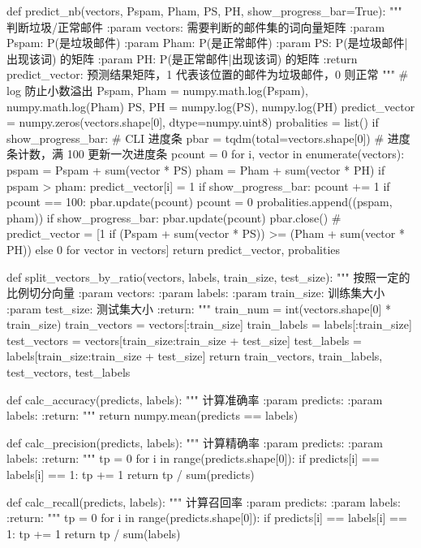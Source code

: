 \documentclass[UTF8,zihao=-4]{ctexart}
\begin{document}
\begin{python}
def predict_nb(vectors, Pspam, Pham, PS, PH, show_progress_bar=True):
    """
    判断垃圾/正常邮件
    :param vectors:         需要判断的邮件集的词向量矩阵
    :param Pspam:           P(是垃圾邮件)
    :param Pham:            P(是正常邮件)
    :param PS:              P(是垃圾邮件|出现该词) 的矩阵
    :param PH:              P(是正常邮件|出现该词) 的矩阵
    :return predict_vector: 预测结果矩阵，1 代表该位置的邮件为垃圾邮件，0 则正常
    """
    # log 防止小数溢出
    Pspam, Pham = numpy.math.log(Pspam), numpy.math.log(Pham)
    PS, PH = numpy.log(PS), numpy.log(PH)
    predict_vector = numpy.zeros(vectors.shape[0], dtype=numpy.uint8)
    probalities = list()
    if show_progress_bar:
        # CLI 进度条
        pbar = tqdm(total=vectors.shape[0])
        # 进度条计数，满 100 更新一次进度条
        pcount = 0
    for i, vector in enumerate(vectors):
        pspam = Pspam + sum(vector * PS)
        pham = Pham + sum(vector * PH)
        if pspam > pham:
            predict_vector[i] = 1
        if show_progress_bar:
            pcount += 1
            if pcount == 100:
                pbar.update(pcount)
                pcount = 0
        probalities.append((pspam, pham))
    if show_progress_bar:
        pbar.update(pcount)
        pbar.close()
    # predict_vector = [1 if (Pspam + sum(vector * PS)) >= (Pham + sum(vector * PH)) else 0 for vector in vectors]
    return predict_vector, probalities


def split_vectors_by_ratio(vectors, labels, train_size, test_size):
    """
    按照一定的比例切分向量
    :param vectors:
    :param labels:
    :param train_size:   训练集大小
    :param test_size:   测试集大小
    :return:
    """
    train_num = int(vectors.shape[0] * train_size)
    train_vectors = vectors[:train_size]
    train_labels = labels[:train_size]
    test_vectors = vectors[train_size:train_size + test_size]
    test_labels = labels[train_size:train_size + test_size]
    return train_vectors, train_labels, test_vectors, test_labels


def calc_accuracy(predicts, labels):
    """
    计算准确率
    :param predicts:
    :param labels:
    :return:
    """
    return numpy.mean(predicts == labels)


def calc_precision(predicts, labels):
    """
    计算精确率
    :param predicts:
    :param labels:
    :return:
    """
    tp = 0
    for i in range(predicts.shape[0]):
        if predicts[i] == labels[i] == 1:
            tp += 1
    return tp / sum(predicts)


def calc_recall(predicts, labels):
    """
    计算召回率
    :param predicts:
    :param labels:
    :return:
    """
    tp = 0
    for i in range(predicts.shape[0]):
        if predicts[i] == labels[i] == 1:
            tp += 1
    return tp / sum(labels)



\end{python}
\end{document}
